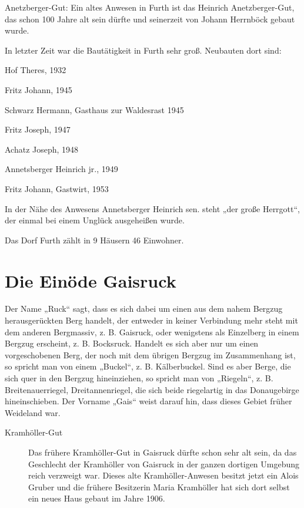 \documentclass[12pt,a4pager,draft]{book}
\begin{document}
Anetzberger-Gut: Ein altes Anwesen in Furth ist das Heinrich Anetzberger-Gut,
das schon 100 Jahre alt sein dürfte und seinerzeit von Johann Herrnböck gebaut
wurde.

In letzter Zeit war die Bautätigkeit in Furth sehr groß. Neubauten dort sind:

\begin{compactitem}
\item Hof Theres, 1932
\item Fritz Johann, 1945
\item Schwarz Hermann, Gasthaus zur Waldesrast 1945
\item Fritz Joseph, 1947
\item Achatz Joseph, 1948
\item Annetsberger Heinrich jr., 1949
\item Fritz Johann, Gastwirt, 1953
\end{compactitem}

In der Nähe des Anwesens Annetsberger Heinrich sen. steht „der große Herrgott“,
der einmal bei einem Unglück ausgeheißen wurde.

Das Dorf Furth zählt in 9 Häusern 46 Einwohner.

\section{Die Einöde Gaisruck}

Der Name „Ruck“ sagt, dass es sich dabei um einen aus dem nahem Bergzug
herausgerückten Berg handelt, der entweder in keiner Verbindung mehr steht mit
dem anderen Bergmassiv, z. B. Gaisruck, oder wenigstens als Einzelberg in einem
Bergzug erscheint, z. B. Bocksruck. Handelt es sich aber nur um einen
vorgeschobenen Berg, der noch mit dem übrigen Bergzug im Zusammenhang ist, so
spricht man von einem „Buckel“, z. B. Kälberbuckel. Sind es aber Berge, die sich
quer in den Bergzug hineinziehen, so spricht man von „Riegeln“, z. B.
Breitenauerriegel, Dreitannenriegel, die sich beide riegelartig in das
Donaugebirge hineinschieben. Der Vorname „Gais“ weist darauf hin, dass dieses
Gebiet früher Weideland war.

\begin{description}
\item[Kramhöller-Gut] Das frühere Kramhöller-Gut in Gaisruck dürfte schon sehr
alt sein, da das Geschlecht der Kramhöller von Gaisruck in der ganzen dortigen
Umgebung reich verzweigt war. Dieses alte Kramhöller-Anwesen besitzt jetzt ein
Alois Gruber und die frühere Besitzerin Maria Kramhöller hat sich dort selbst
ein neues Haus gebaut im Jahre 1906.
\end{description}
\end{document}
